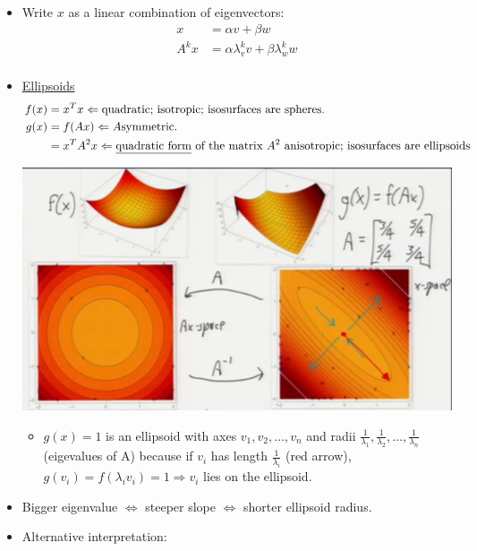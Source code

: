 \documentclass[10pt]{article}
\begin{document}
\begin{description}
\begin{itemize}
\begin{center}
				\end{center}
			\item Write $x$ as a linear combination of eigenvectors:
				\begin{align*}
					x &= \alpha v + \beta w\\
					A^{k}x &= \alpha \lambda_{v}^{k} v + \beta \lambda_{w}^{k} w\\
				\end{align*}
			\item \underline{Ellipsoids}
				\begin{align*}
					f(x) &= x^{T}x \Leftarrow \text{quadratic; isotropic; isosurfaces are spheres.}\\
					g(x) &= f(Ax) \Leftarrow A \text{symmetric}.\\
					  	&= x^{T}A^{2}x \Leftarrow\text{\underline{quadratic form} of the matrix} \ A^{2} \ \text{anisotropic; isosurfaces are ellipsoids}\\
				\end{align*}
				\begin{center}
					\includegraphics[scale=0.7]{images/ellipses}
				\end{center}
				\begin{itemize}
					\item $g(x) = 1$ is an ellipsoid with axes $v_{1}, v_{2}, \dots, v_{n}$  and radii $\frac{1}{\lambda_{1}}, \frac{1}{\lambda_{2}}, \dots, \frac{1}{\lambda_{n}}$ (eigevalues of A) because if $v_{i}$ has length $\frac{1}{\lambda_{i}}$ (red arrow), $g(v_{i}) = f(\lambda_{i}v_{i}) = 1 \Rightarrow v_{i}$ lies on the ellipsoid.
				\end{itemize}
			\item Bigger eigenvalue $\Leftrightarrow$ steeper slope $\Leftrightarrow$ shorter ellipsoid radius.
			\item Alternative interpretation:

\end{itemize}
\end{description}
\end{document}
